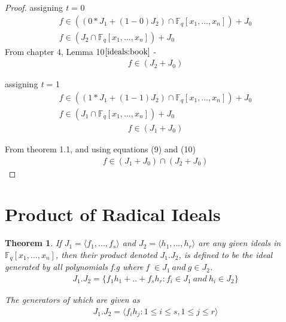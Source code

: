 \documentclass{article}
\newtheorem{Theorem}{Theorem}[section]
\newcommand{\Fq}{{\mathbb{F}}_{q}}
\newcommand{\Jo}{J_1}
\newcommand{\Jz}{J_0}
\newcommand{\Jt}{J_2}
\newcommand{\Joz}{J_1 + J_0}
\newcommand{\Jtz}{J_2 + J_0}
\begin{document}
\begin{proof}
assigning \textit{t} = 0
\begin{gather*}
f \in ((0*\Jo+ (1-0)\Jt) \cap \Fq[x_1,...,x_n]) + \Jz\\
f \in (\Jt \cap \Fq[x_1,...,x_n]) + \Jz
\end{gather*}
From chapter 4, Lemma 10$\cite{ideals:book}$ -
\begin{align}
f \in (\Jt + \Jz)
\end{align}

assigning \textit{t} = 1
\begin{gather*}
f \in ((1*\Jo+ (1-1)\Jt) \cap \Fq[x_1,...,x_n]) + \Jz\\
f \in (\Jo \cap \Fq[x_1,...,x_n]) + \Jz
\end{gather*}
\begin{align}
f \in (\Jo + \Jz)
\end{align}


From theorem 1.1, and using equations (9) and (10)
\begin{align*}
\textit{f} \in (\Joz) \cap (\Jtz)
\end{align*} 
\end{proof}

\section{Product of Radical Ideals}
\begin{Theorem}
\textit{If} $\Jo = \langle f_1,...,f_s\rangle$ \textit{and} $\Jt = \langle h_1,...,h_r \rangle$ \textit{are any given ideals in} $\Fq[x_1,...,x_n]$, \textit{ then their product denoted} $\Jo.\Jt$, \textit{is defined to be the ideal generated by all polynomials f.g where f $\in \Jo\ and\ g \in \Jt$.}
\begin{align*}
\Jo.\Jt = \{ f_1h_1+..+f_sh_r : f_i \in \Jo\ and\ h_i \in \Jt\}  
\end{align*}

The generators of which are given as 
\begin{align}
\Jo.\Jt = \langle f_ih_j : 1 \le i \le s , 1 \le j \le r\rangle
\end{align}
\end{Theorem}
\end{document}
